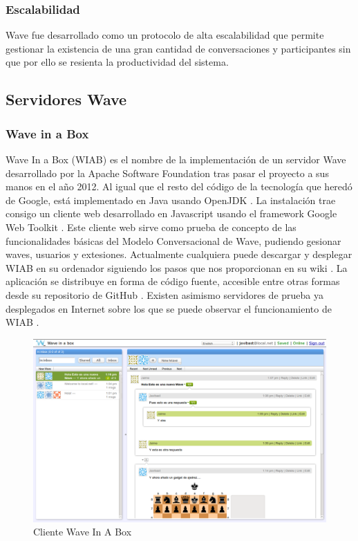     \subsubsection{Escalabilidad}
    
    Wave fue desarrollado como un protocolo de alta escalabilidad que permite gestionar la existencia de una gran cantidad de conversaciones y participantes sin que por ello se resienta la productividad del sistema.
    
    \subsection{Servidores Wave}
  
    \subsubsection{Wave in a Box}\label{sssec:wiab}
    
    Wave In a Box (WIAB) \cite{ref:wave_in_a_box} es el nombre de la implementación de un servidor Wave desarrollado por la Apache Software Foundation tras pasar el proyecto a sus manos en el año 2012. Al igual que el resto del código de la tecnología que heredó de Google, está implementado en Java usando OpenJDK \cite{ref:openjdk}. La instalación trae consigo un cliente web desarrollado en Javascript usando el framework Google Web Toolkit \cite{ref:gwt}. Este cliente web sirve como prueba de concepto de las funcionalidades básicas del Modelo Conversacional de Wave, pudiendo gesionar waves, usuarios y extesiones. Actualmente cualquiera puede descargar y desplegar WIAB en su ordenador siguiendo los pasos que nos proporcionan en su wiki \cite{ref:wave_in_a_box_wiki}. La aplicación se distribuye en forma de código fuente, accesible entre otras formas desde su repositorio de GitHub \cite{ref:wave_in_a_box_github}. Existen asimismo servidores de prueba ya desplegados en Internet sobre los que se puede observar el funcionamiento de WIAB \cite{ref:wave_in_a_box_server}.
   
   
    \begin{figure}[H]
      \centering
	\includegraphics[keepaspectratio, scale=0.3]{Media/Captures/WIAB_Server.png}
      \caption{Cliente Wave In A Box}
      \label{fig:wiab_client}
    \end{figure}
   
